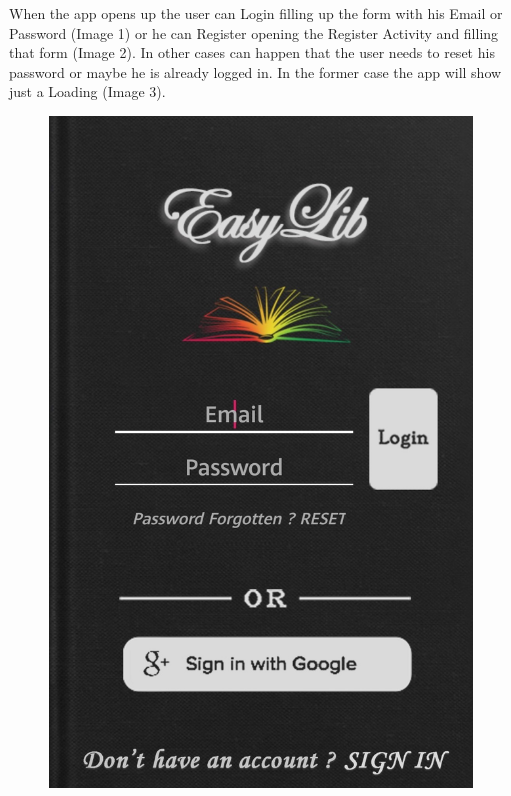 \vspace{5mm}
When the app opens up the user can Login filling up the form with his Email or Password (Image 1) or he can Register opening the Register Activity and filling that form (Image 2). In other cases can happen that the user needs to reset his password or maybe he is already logged in. In the former case the app will show just a Loading (Image 3).
\begin{figure}[H]
	\centering
	\includegraphics[scale=0.15]{Images/UI/Login_Register/1}
	\hspace{0.5cm}

\end{figure}
